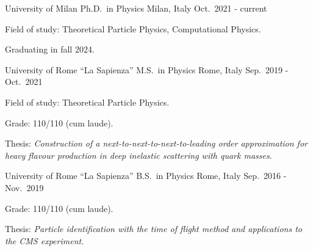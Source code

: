

\begin{cventries}

    \cventry
        {University of Milan} %
        {Ph.D.\ in Physics} %
        {Milan, Italy} %
        {Oct.\ 2021 - current} %
        {
        \begin{cvitems} %
            \item Field of study: Theoretical Particle Physics, Computational Physics.
            \item Graduating in fall 2024.
        \end{cvitems}
        }

    \cventry
        {University of Rome ``La Sapienza''} %
        {M.S.\ in Physics} %
        {Rome, Italy} %
        {Sep.\ 2019 - Oct.\ 2021} %
        {
        \begin{cvitems} %
            \item Field of study: Theoretical Particle Physics.
            \item Grade: 110/110 (cum laude).
            \item Thesis: \emph{Construction of a next-to-next-to-next-to-leading order approximation for heavy flavour production in deep inelastic scattering with quark masses}. \href{https://inspirehep.net/literature/2750247}{\textcolor{awesome-red}{}}
        \end{cvitems}
        }

    \cventry
        {University of Rome ``La Sapienza''} %
        {B.S.\ in Physics} %
        {Rome, Italy} %
        {Sep.\ 2016 - Nov.\ 2019} %
        {
        \begin{cvitems} %
            \item Grade: 110/110 (cum laude).
            \item Thesis: \emph{Particle identification with the time of flight method and applications to the CMS experiment}.
        \end{cvitems}
        }

\end{cventries}